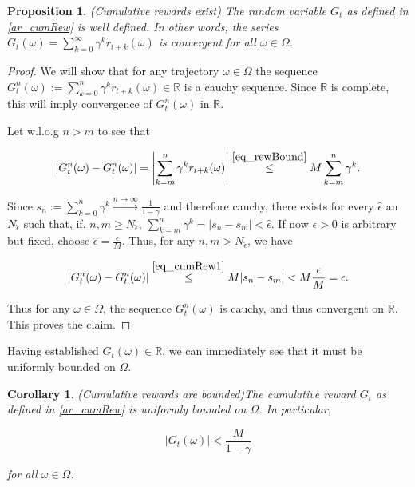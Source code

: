 \documentclass[11pt]{article} %
\newtheorem{prop}{Proposition}
\newtheorem{cor}{Corollary}
\begin{document}
\begin{prop}\label{prop_cumRewEx}{(Cumulative rewards exist)}
	The random variable $G_t$ as defined in \ref{ar_cumRew} is well defined. In other words, the series $G_t(\omega) = \sum_{k=0}^{\infty} \gamma^k r_{t+k}(\omega)$ is convergent for all $\omega \in \Omega$.
\end{prop}

\begin{proof}
We will show that for any trajectory $\omega \in \Omega$ the sequence $G_t^n(\omega) := \sum_{k=0}^{n} \gamma^k r_{t+k}(\omega) \in \mathbb{R}$ is a cauchy sequence. Since $\mathbb{R}$ is complete, this will imply convergence of $G_t^n(\omega)$ in $\mathbb{R}$.

Let w.l.o.g $n > m$ to see that

	\begin{equation}\label{eq_cumRew1}
		\left| G_t^n(\omega) - G_t^n(\omega)\right| = \left| \sum_{k=m}^n \gamma^k r_{t+k}(\omega) \right| \overset{\ref{eq_rewBound}}{\le} M \sum_{k=m}^n \gamma^k.
	\end{equation}

Since $s_n := \sum_{k=0}^n \gamma^k \overset{n \rightarrow \infty}{\rightarrow} \frac{1}{1-\gamma}$ and therefore cauchy, there exists for every $\hat{\epsilon}$ an $N_{\hat{\epsilon}}$ such that, if, $n,m \ge N_{\hat{\epsilon}}$, $\sum_{k=m}^n \gamma^k = |s_n - s_m| < \hat{\epsilon}$. If now $\epsilon >0$ is arbitrary but fixed, choose $\hat{\epsilon} = \frac{\epsilon}{M}$. Thus, for any $n,m > N_{\hat{\epsilon}}$, we have

\begin{equation}\label{eq_cumRew2}
	\left|G_t^n(\omega) - G_t^n(\omega)\right| \overset{\ref{eq_cumRew1}}{\le} M |s_n - s_m| < M \frac{\epsilon}{M} = \epsilon.
\end{equation}

Thus for any $\omega \in \Omega$, the sequence $G_t^n(\omega)$ is cauchy, and thus convergent on $\mathbb{R}$. This proves the claim.

\end{proof}

Having established $G_t(\omega) \in \mathbb{R}$, we can immediately see that it must be uniformly bounded on $\Omega$.

\begin{cor}{(Cumulative rewards are bounded)}\label{cor_unifBoundCumRew}
	The cumulative reward $G_t$ as defined in \ref{ar_cumRew} is uniformly bounded on $\Omega$. In particular, 

	\begin{equation}\label{eq_boundCumRew}
		|G_t(\omega)| < \frac{M}{1 - \gamma}
	\end{equation}

	for all $\omega \in \Omega$.
\end{cor}
\end{document}
